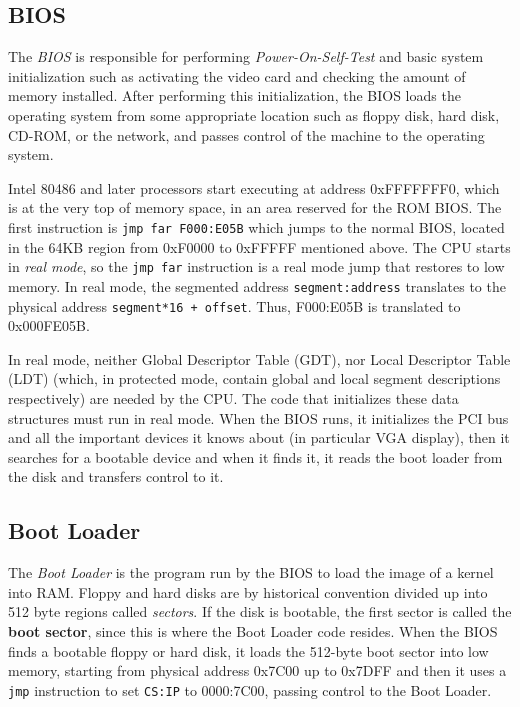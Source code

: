 \subsection{BIOS}
The \emph{BIOS} is responsible for performing \emph{Power-On-Self-Test} and basic system initialization such as activating the video card and checking the amount of memory installed. After performing this initialization, the BIOS loads the operating system from some appropriate location such as floppy disk, hard disk, CD-ROM, or the network, and passes control of the machine to the operating system.

Intel 80486 and later processors start executing at address 0xFFFFFFF0, which is at the very top of memory space, in an area reserved for the ROM BIOS. The first instruction is \texttt{jmp far F000:E05B} which jumps to the normal BIOS, located in the 64KB region from 0xF0000 to 0xFFFFF mentioned above. The CPU starts in \emph{real mode}, so the \texttt{jmp far} instruction is a real mode jump that restores to low memory. In real mode, the segmented address \texttt{segment:address} translates to the physical address \texttt{segment*16 + offset}. Thus, F000:E05B is translated to 0x000FE05B.

In real mode, neither Global Descriptor Table (GDT), nor Local Descriptor Table (LDT) (which, in protected mode, contain global and local segment descriptions respectively) are needed by the CPU. The code that initializes these data structures must run in real mode. When the BIOS runs, it initializes the PCI bus and all the important devices it knows about (in particular VGA display), then it searches for a bootable device and when it finds it, it reads the boot loader from the disk and transfers control to it.

\subsection{Boot Loader}
The \emph{Boot Loader} is the program run by the BIOS to load the image of a kernel into RAM. Floppy and hard disks are by historical convention divided up into 512 byte regions called \emph{sectors}. If the disk is bootable, the first sector is called the \textbf{boot sector}, since this is where the Boot Loader code resides. When the BIOS finds a bootable floppy or hard disk, it loads the 512-byte boot sector into low memory, starting from physical address 0x7C00 up to 0x7DFF and then it uses a \texttt{jmp} instruction to set \texttt{CS:IP} to 0000:7C00, passing control to the Boot Loader.

